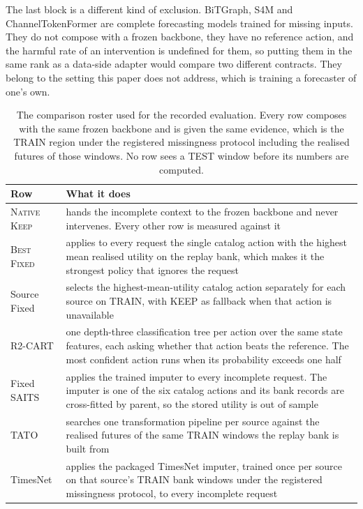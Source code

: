 \documentclass{article}
\begin{document}
The last block is a different kind of exclusion. BiTGraph, S4M and ChannelTokenFormer are
complete forecasting models trained for missing inputs. They do not compose with a frozen
backbone, they have no reference action, and the harmful rate of an intervention is undefined
for them, so putting them in the same rank as a data-side adapter would compare two different
contracts. They belong to the setting this paper does not address, which is training a
forecaster of one's own.

\begin{table}[htbp]
  \caption{The comparison roster used for the recorded evaluation. Every row composes with
  the same frozen backbone and is given the same evidence, which is the TRAIN region under the
  registered missingness protocol including the realised futures of those windows. No row sees
  a TEST window before its numbers are computed.}
  \label{tab:app-roster}
  \centering
  \small
  \setlength{\tabcolsep}{4pt}
\begin{tabular}{@{}l p{}@{}}
    \toprule
    Row & What it does \\
    \midrule
    \textsc{Native Keep} & hands the incomplete context to the frozen backbone and never intervenes. Every other row is measured against it \\
    \textsc{Best Fixed} & applies to every request the single catalog action with the highest mean realised utility on the replay bank, which makes it the strongest policy that ignores the request \\
    Source Fixed & selects the highest-mean-utility catalog action separately for each source on TRAIN, with KEEP as fallback when that action is unavailable \\
    R2-CART & one depth-three classification tree per action over the same state features, each asking whether that action beats the reference. The most confident action runs when its probability exceeds one half \\
    Fixed SAITS & applies the trained imputer to every incomplete request. The imputer is one of the six catalog actions and its bank records are cross-fitted by parent, so the stored utility is out of sample \\
    TATO & searches one transformation pipeline per source against the realised futures of the same TRAIN windows the replay bank is built from \\
    TimesNet & applies the packaged TimesNet imputer, trained once per source on that source's TRAIN bank windows under the registered missingness protocol, to every incomplete request \\

\end{tabular}
\end{table}
\end{document}
